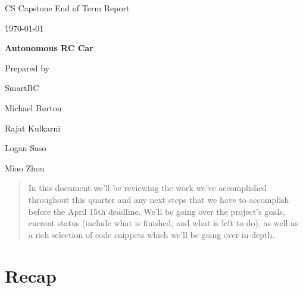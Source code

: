 \documentclass[onecolumn, draftclsnofoot, 10pt, compsoc]{IEEEtran}
\def \CapstoneTeamName{Team 42}
\def \GroupMemberOne{			Michael Burton}
\def \GroupMemberTwo{			Rajat Kulkarni}
\def \GroupMemberThree{			Logan Saso}
\def \GroupMemberFour{			Miao Zhou}
\def \CapstoneProjectName{		Autonomous RC Car}
\def \DocType{	%
				End of Term Report
				}
\newcommand{\NameSigPair}[1]{\par
\makebox[2.75in][r]{#1} \hfil 	\makebox[3.25in]{\makebox[2.25in]{\hrulefill} \hfill		\makebox[.75in]{\hrulefill}}
\par\vspace{-12pt} \textit{\tiny\noindent
\makebox[2.75in]{} \hfil		\makebox[3.25in]{\makebox[2.25in][r]{Signature} \hfill	\makebox[.75in][r]{Date}}}}
\renewcommand{\NameSigPair}[1]{#1}
\begin{document}
\begin{titlepage}
    \begin{singlespace}
        \hfill 
        \par\vspace{.2in}
        \centering
        \scshape{
            \huge CS Capstone \DocType \par
            {\large\today}\par
            \vspace{.5in}
            \textbf{\Huge\CapstoneProjectName}\par
            \vfill
            {\large Prepared by }\par
            SmartRC\par
            \vspace{5pt}
            {\Large
                \NameSigPair{\GroupMemberOne}\par
                \NameSigPair{\GroupMemberTwo}\par
                \NameSigPair{\GroupMemberThree}\par
                \NameSigPair{\GroupMemberFour}\par
            }
            \vspace{20pt}
        }
        \begin{abstract}

        In this document we'll be reviewing the work we've accomplished throughout this quarter and any next steps that we have to accomplish before the April 15th deadline. We'll be going over the project's goals, current status (include what is finished, and what is left to do), as well as a rich selection of code snippets which we'll be going over in-depth.

        \end{abstract}     
    \end{singlespace}
\end{titlepage}
\newpage
{}
\tableofcontents

\clearpage

\section{Recap}
\end{document}
